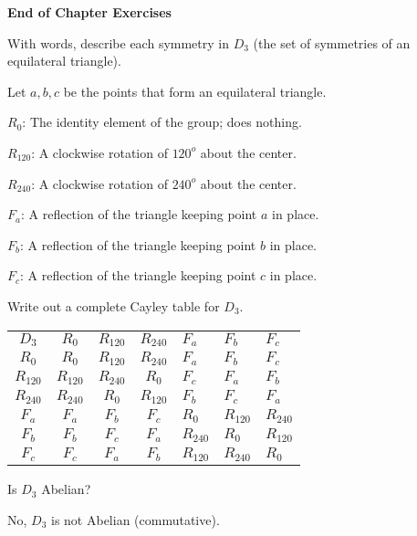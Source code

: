 \documentclass[11pt,largemargins]{homework}
\begin{document}
\maketitle


\textbf{\large{End of Chapter Exercises}}

\question
With words, describe each symmetry in $D_3$ (the set of symmetries of an equilateral triangle).

Let $a,b,c$ be the points that form an equilateral triangle.

\quad $R_0$: The identity element of the group; does nothing.

\quad $R_{120}$: A clockwise rotation of $120^o$ about the center.

\quad $R_{240}$: A clockwise rotation of $240^o$ about the center.

\quad $F_a$: A reflection of the triangle keeping point $a$ in place.

\quad $F_b$: A reflection of the triangle keeping point $b$ in place.

\quad $F_c$: A reflection of the triangle keeping point $c$ in place.

\question 
Write out a complete Cayley table for $D_3$. 

\centering
\begin{tabular}{cccclll}
   $D_3$       &  $R_0$     &  $R_{120}$  &  $R_{240}$  & $F_a$     & $F_b$     &  $F_c$  \\
   $R_0$       &  $R_0$     &  $R_{120}$  &  $R_{240}$  & $F_a$     & $F_b$     &  $F_c$  \\
   $R_{120}$   &  $R_{120}$ &  $R_{240}$  &  $R_0$      & $F_c$     & $F_a$     &  $F_b$  \\
   $R_{240}$   &  $R_{240}$ &  $R_0$      &  $R_{120}$  & $F_b$     & $F_c$     &  $F_a$  \\
   $F_a$       &  $F_a$     &  $F_b$      &  $F_c$      & $R_0$     & $R_{120}$ &  $R_{240}$  \\
   $F_b$       &  $F_b$     &  $F_c$      &  $F_a$      & $R_{240}$ & $R_0$     &  $R_{120}$  \\
   $F_c$       &  $F_c$     &  $F_a$      &  $F_b$      & $R_{120}$ & $R_{240}$ &  $R_0$  
\end{tabular}

\raggedright

\question 
Is $D_3$ Abelian?

\quad No, $D_3$ is not Abelian (commutative).
\end{document}
